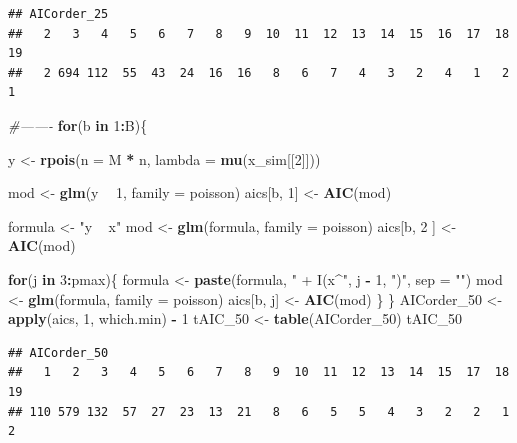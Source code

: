 \documentclass[]{article}
\newenvironment{Shaded}{\begin{snugshade}}{\end{snugshade}}
\newcommand{\CommentTok}[1]{\textcolor[rgb]{0.56,0.35,0.01}{\textit{#1}}}
\newcommand{\ControlFlowTok}[1]{\textcolor[rgb]{0.13,0.29,0.53}{\textbf{#1}}}
\newcommand{\DataTypeTok}[1]{\textcolor[rgb]{0.13,0.29,0.53}{#1}}
\newcommand{\DecValTok}[1]{\textcolor[rgb]{0.00,0.00,0.81}{#1}}
\newcommand{\KeywordTok}[1]{\textcolor[rgb]{0.13,0.29,0.53}{\textbf{#1}}}
\newcommand{\NormalTok}[1]{#1}
\newcommand{\OperatorTok}[1]{\textcolor[rgb]{0.81,0.36,0.00}{\textbf{#1}}}
\newcommand{\StringTok}[1]{\textcolor[rgb]{0.31,0.60,0.02}{#1}}
\begin{document}
\begin{verbatim}
## AICorder_25
##   2   3   4   5   6   7   8   9  10  11  12  13  14  15  16  17  18  19 
##   2 694 112  55  43  24  16  16   8   6   7   4   3   2   4   1   2   1
\end{verbatim}

\begin{Shaded}
\begin{Highlighting}[]
\CommentTok{#-------}
\ControlFlowTok{for}\NormalTok{(b }\ControlFlowTok{in} \DecValTok{1}\OperatorTok{:}\NormalTok{B)\{}
  
\NormalTok{  y <-}\StringTok{ }\KeywordTok{rpois}\NormalTok{(}\DataTypeTok{n =}\NormalTok{ M }\OperatorTok{*}\StringTok{ }\NormalTok{n, }\DataTypeTok{lambda =} \KeywordTok{mu}\NormalTok{(x_sim[[}\DecValTok{2}\NormalTok{]]))}
  
\NormalTok{  mod <-}\StringTok{ }\KeywordTok{glm}\NormalTok{(y }\OperatorTok{~}\StringTok{ }\DecValTok{1}\NormalTok{, }\DataTypeTok{family =}\NormalTok{ poisson)}
\NormalTok{  aics[b, }\DecValTok{1}\NormalTok{] <-}\StringTok{ }\KeywordTok{AIC}\NormalTok{(mod)}
  
\NormalTok{  formula <-}\StringTok{ "y ~ x"}
\NormalTok{  mod <-}\StringTok{ }\KeywordTok{glm}\NormalTok{(formula, }\DataTypeTok{family =}\NormalTok{ poisson)}
\NormalTok{  aics[b, }\DecValTok{2}\NormalTok{ ] <-}\StringTok{ }\KeywordTok{AIC}\NormalTok{(mod)}
  
  \ControlFlowTok{for}\NormalTok{(j }\ControlFlowTok{in} \DecValTok{3}\OperatorTok{:}\NormalTok{pmax)\{}
\NormalTok{    formula <-}\StringTok{ }\KeywordTok{paste}\NormalTok{(formula, }\StringTok{" + I(x^"}\NormalTok{, j }\OperatorTok{-}\StringTok{ }\DecValTok{1}\NormalTok{, }\StringTok{")"}\NormalTok{, }\DataTypeTok{sep =} \StringTok{""}\NormalTok{)}
\NormalTok{    mod <-}\StringTok{ }\KeywordTok{glm}\NormalTok{(formula, }\DataTypeTok{family =}\NormalTok{ poisson)}
\NormalTok{    aics[b, j] <-}\StringTok{ }\KeywordTok{AIC}\NormalTok{(mod)}
\NormalTok{  \}}
\NormalTok{\}}
\NormalTok{AICorder_}\DecValTok{50}\NormalTok{ <-}\StringTok{ }\KeywordTok{apply}\NormalTok{(aics, }\DecValTok{1}\NormalTok{, which.min) }\OperatorTok{-}\StringTok{ }\DecValTok{1}
\NormalTok{tAIC_}\DecValTok{50}\NormalTok{ <-}\StringTok{ }\KeywordTok{table}\NormalTok{(AICorder_}\DecValTok{50}\NormalTok{)}
\NormalTok{tAIC_}\DecValTok{50}
\end{Highlighting}
\end{Shaded}

\begin{verbatim}
## AICorder_50
##   1   2   3   4   5   6   7   8   9  10  11  12  13  14  15  17  18  19 
## 110 579 132  57  27  23  13  21   8   6   5   5   4   3   2   2   1   2
\end{verbatim}
\end{document}
